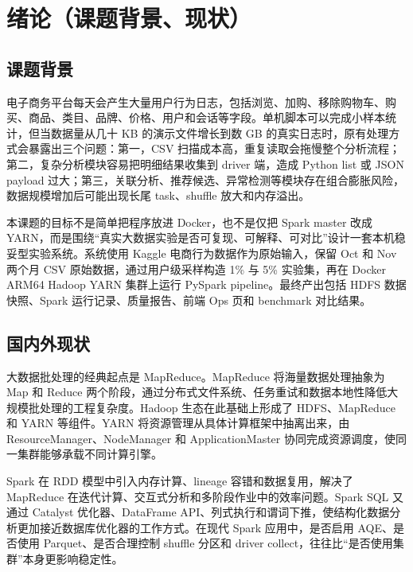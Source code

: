 
\chapter{绪论（课题背景、现状）}

\section{课题背景}

电子商务平台每天会产生大量用户行为日志，包括浏览、加购、移除购物车、购买、商品、类目、品牌、价格、用户和会话等字段。单机脚本可以完成小样本统计，但当数据量从几十 KB 的演示文件增长到数 GB 的真实日志时，原有处理方式会暴露出三个问题：第一，CSV 扫描成本高，重复读取会拖慢整个分析流程；第二，复杂分析模块容易把明细结果收集到 driver 端，造成 Python list 或 JSON payload 过大；第三，关联分析、推荐候选、异常检测等模块存在组合膨胀风险，数据规模增加后可能出现长尾 task、shuffle 放大和内存溢出。

本课题的目标不是简单把程序放进 Docker，也不是仅把 Spark master 改成 YARN，而是围绕“真实大数据实验是否可复现、可解释、可对比”设计一套本机稳妥型实验系统。系统使用 Kaggle 电商行为数据作为原始输入，保留 Oct 和 Nov 两个月 CSV 原始数据，通过用户级采样构造 1\% 与 5\% 实验集，再在 Docker ARM64 Hadoop YARN 集群上运行 PySpark pipeline。最终产出包括 HDFS 数据快照、Spark 运行记录、质量报告、前端 Ops 页和 benchmark 对比结果。

\section{国内外现状}

大数据批处理的经典起点是 MapReduce。MapReduce 将海量数据处理抽象为 Map 和 Reduce 两个阶段，通过分布式文件系统、任务重试和数据本地性降低大规模批处理的工程复杂度\cite{dean2004mapreduce}。Hadoop 生态在此基础上形成了 HDFS、MapReduce 和 YARN 等组件。YARN 将资源管理从具体计算框架中抽离出来，由 ResourceManager、NodeManager 和 ApplicationMaster 协同完成资源调度，使同一集群能够承载不同计算引擎\cite{vavilapalli2013yarn}。

Spark 在 RDD 模型中引入内存计算、lineage 容错和数据复用，解决了 MapReduce 在迭代计算、交互式分析和多阶段作业中的效率问题\cite{zaharia2012rdd,zaharia2016spark}。Spark SQL 又通过 Catalyst 优化器、DataFrame API、列式执行和谓词下推，使结构化数据分析更加接近数据库优化器的工作方式\cite{armbrust2015spark}。在现代 Spark 应用中，是否启用 AQE、是否使用 Parquet、是否合理控制 shuffle 分区和 driver collect，往往比“是否使用集群”本身更影响稳定性。

